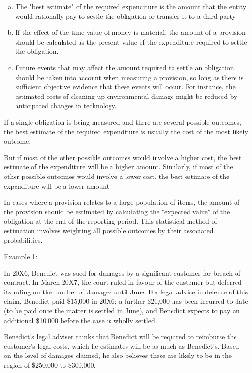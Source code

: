 \begin{enumerate}[a.]
    \item The "best estimate" of the required expenditure is the amount that the entity would rationally pay to settle the obligation or transfer it to a third party. 
    \item If the effect of the time value of money is material, the amount of a provision should be calculated as the present value of the expenditure required to settle the obligation. 
    \item Future events that may affect the amount required to settle an obligation should be taken into account when measuring a provision, so long as there is sufficient objective evidence that these events will occur. For instance, the estimated costs of cleaning up environmental damage might be reduced by anticipated changes in technology. 
\end{enumerate}

If a single obligation is being measured and there are several possible outcomes, the best estimate of the required expenditure is usually the cost of the most likely outcome.

But if most of the other possible outcomes would involve a higher cost, the best estimate of the expenditure will be a higher amount. Similarly, if most of the other possible outcomes would involve a lower cost, the best estimate of the
expenditure will be a lower amount.

In cases where a provision relates to a large population of items, the amount of the provision should be estimated by calculating the "expected value" of the obligation at the
end of the reporting period. This statistical method of estimation involves weighting all possible outcomes by their associated probabilities.

Example 1: 

In 20X6, Benedict was sued for damages by a significant customer for breach of contract. 
In March 20X7, the court ruled in favour of the customer but deferred its ruling on the number 
of damages until June. For legal advice in defence of this claim, Benedict paid \$15,000 in 20X6;
a further \$20,000 has been incurred to date (to be paid once the matter is settled in June), and Benedict expects 
to pay an additional \$10,000 before the case is wholly settled.

Benedict’s legal adviser thinks that Benedict will be required to reimburse the customer's legal costs, which he estimates will be as much as 
Benedict’s. Based on the level of damages claimed, he also believes these are likely to be in the region of \$250,000 to \$300,000.

